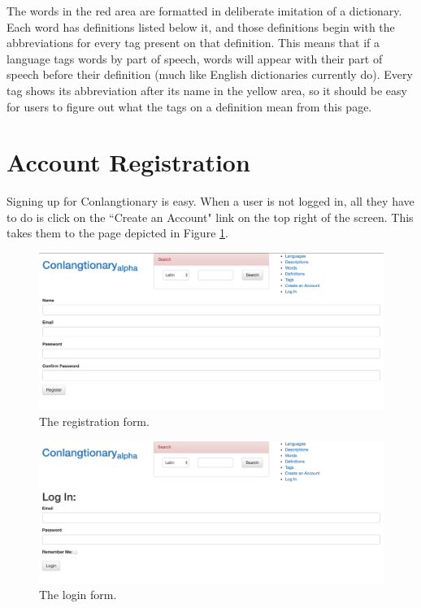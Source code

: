 The words in the red area are formatted in deliberate imitation of a dictionary. Each word has definitions listed below it, and those definitions begin with the abbreviations for every tag present on that definition. This means that if a language tags words by part of speech, words will appear with their part of speech before their definition (much like English dictionaries currently do). Every tag shows its abbreviation after its name in the yellow area, so it should be easy for users to figure out what the tags on a definition mean from this page.

\section{Account Registration}
\label{sec:account-registration}

Signing up for Conlangtionary is easy. When a user is not logged in, all they have to do is click on the ``Create an Account" link on the top right of the screen. This takes them to the page depicted in Figure \ref{fig:registration-form}. 

\begin{figure}[!h]
\includegraphics[width=\textwidth]{figures/registration-form}
\caption{The registration form.}
\centering
\label{fig:registration-form}
\end{figure}

\begin{figure}[h]
\includegraphics[width=\textwidth]{figures/log-in}
\caption{The login form.}
\centering
\label{fig:log-in}
\end{figure}

